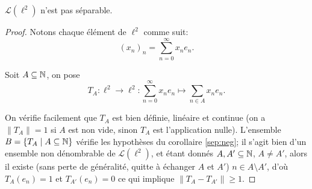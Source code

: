 \begin{ex}
  $\mathcal L(\ell^2)$ n'est pas séparable.
\end{ex}
\begin{proof}
  Notons chaque élément de $\ell^2$ comme suit:
  $$(x_n)_n = \sum_{n=0}^\infty x_n e_n.$$

  Soit $A\subseteq \mathbb{N}$, on pose
  $$T_A: \ell^2 \to\ell^2: \sum_{n=0}^\infty x_n e_n \mapsto
  \sum_{n\in A} x_n e_n.$$

  On vérifie facilement que $T_A$ est bien définie, linéaire et continue
  (on a $\|T_A\|= 1$ si $A$ est non vide, sinon $T_A$ est l'application nulle).
  L'ensemble $B = \{T_A\mid A\subseteq \mathbb{N}\}$ vérifie les hypothèses du
  corollaire  \ref{sep:neg}; il s'agit bien d'un ensemble non dénombrable
  de $\mathcal L(\ell^2)$, et étant donnés $A, A'\subseteq \mathbb{N}$, $A\neq A'$,
  alors il existe (sans perte de généralité, quitte à échanger $A$ et $A'$)
  $n\in A\setminus A'$, d'où $T_A(e_n) = 1$ et $T_{A'}(e_n) = 0$ ce qui
  implique  $\|T_A - T_{A'}\|\geq 1$.
\end{proof}
